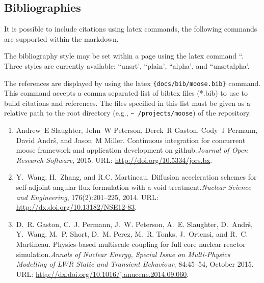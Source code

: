 \documentclass[]{report}
\begin{document}
\subsection{Bibliographies\label{bibliographies}}
\par
It is possible to include citations using latex commands, the following commands are supported within the markdown.
\par
The bibliography style may be set within a page using the latex command
``. Three styles are currently available: ``unsrt', ``plain', ``alpha', and ``unsrtalpha'.
\par
The references are displayed by using the latex \texttt{\{docs/bib/moose.bib\}} command. This command accepts a comma separated list of bibtex files (*.bib) to use to build citations and references. The files specified in this list must be given as a relative path to the root directory (e.g., \texttt{\textasciitilde~/projects/moose}) of the repository.\begin{enumerate}
\item Andrew E Slaughter, John W Peterson, Derek R Gaston, Cody J Permann, David Andrš, and Jason M Miller.
Continuous integration for concurrent moose framework and application development on github.\emph{Journal of Open Research Software}, 2015.
URL: \href{http://doi.org/10.5334/jors.bx}{http://doi.org/10.5334/jors.bx}.
\item Y. Wang, H. Zhang, and R.C. Martineau.
Diffusion acceleration schemes for self-adjoint angular flux formulation with a void treatment.\emph{Nuclear Science and Engineering}, 176(2):201–225, 2014.
URL: \href{http://dx.doi.org/10.13182/NSE12-83}{http://dx.doi.org/10.13182/NSE12-83}.
\item D. R. Gaston, C. J. Permann, J. W. Peterson, A. E. Slaughter, D. Andrš, Y. Wang, M. P. Short, D. M. Perez, M. R. Tonks, J. Ortensi, and R. C. Martineau.
Physics-based multiscale coupling for full core nuclear reactor simulation.\emph{Annals of Nuclear Energy, Special Issue on Multi-Physics Modelling of LWR Static and Transient Behaviour}, 84:45–54, October 2015.
URL: \href{http://dx.doi.org/10.1016/j.anucene.2014.09.060}{http://dx.doi.org/10.1016/j.anucene.2014.09.060}.
\end{enumerate}
\end{document}

